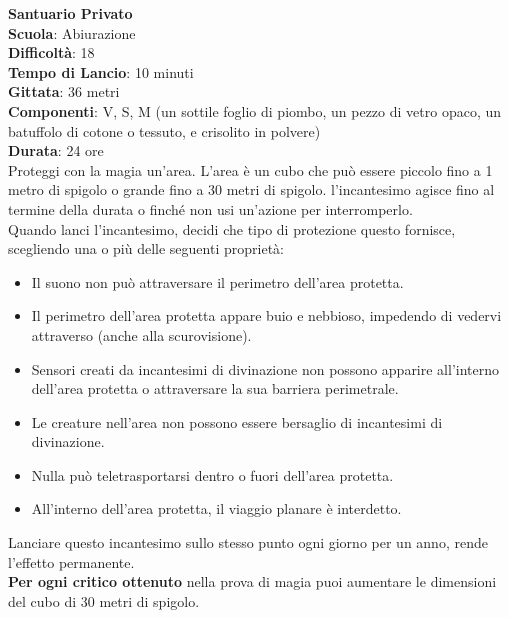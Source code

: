 \begin{multicols}{2}
\medskip\textbf{Santuario Privato}\\
\textbf{Scuola}: Abiurazione\\
\textbf{Difficoltà}:  18\\
\textbf{Tempo di Lancio}: 10 minuti\\
\textbf{Gittata}: 36 metri\\
\textbf{Componenti}: V, S, M (un sottile foglio di piombo, un pezzo di vetro opaco, un batuffolo di cotone o tessuto, e crisolito in polvere)\\
\textbf{Durata}: 24 ore \\
Proteggi con la magia un'area. L’area è un cubo che può essere piccolo fino a 1 metro di spigolo o grande fino a 30 metri di spigolo. l'incantesimo agisce fino al termine della durata o finché non usi un'azione per interromperlo.\\
Quando lanci l'incantesimo, decidi che tipo di protezione questo fornisce, scegliendo una o più delle seguenti proprietà:\\
\medskip
\begin{itemize}
\item
Il suono non può attraversare il perimetro dell'area protetta.
\item
Il perimetro dell'area protetta appare buio e nebbioso, impedendo di vedervi attraverso (anche
alla scurovisione).
\item
Sensori creati da incantesimi di divinazione non possono apparire all'interno dell'area protetta o attraversare la sua barriera perimetrale.
\item
Le creature nell'area non possono essere bersaglio di incantesimi di divinazione.
\item
Nulla può teletrasportarsi dentro o fuori dell'area protetta.
\item
All'interno dell'area protetta, il viaggio planare è interdetto.
\end{itemize}
Lanciare questo incantesimo sullo stesso punto ogni giorno per un anno, rende l’effetto permanente.\\
\textbf{Per ogni critico ottenuto} nella prova di magia puoi aumentare le dimensioni del cubo di 30 metri di spigolo.


\end{multicols}
